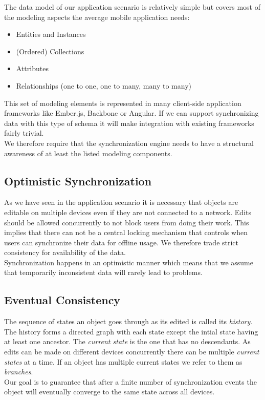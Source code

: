 The data model of our application scenario is relatively simple but covers most of the modeling aspects the average mobile application needs:

\begin{itemize}
\item Entities and Instances
\item (Ordered) Collections
\item Attributes
\item Relationships (one to one, one to many, many to many)
\end{itemize}

This set of modeling elements is represented in many client-side application frameworks like Ember.js, Backbone or Angular.
If we can support synchronizing data with this type of schema it will make integration with existing frameworks fairly trivial.\\
We therefore require that the synchronization engine needs to have a structural awareness of at least the listed modeling components.

\subsection{Optimistic Synchronization}
As we have seen in the application scenario it is necessary that objects are editable on multiple devices even if they are not connected to a network.
Edits should be allowed concurrently to not block users from doing their work.
This implies that there can not be a central locking mechanism that controls when users can synchronize their data for offline usage.
We therefore trade strict consistency for availability of the data.\\
Synchronization happens in an optimistic manner which means that we assume that temporarily inconsistent data will rarely lead to problems.

\subsection{Eventual Consistency}
The sequence of states an object goes through as its edited is called its \emph{history}.
The history forms a directed graph with each state except the intial state having at least one ancestor.
The \emph{current state} is the one that has no descendants.
As edits can be made on different devices concurrently there can be multiple \emph{current states} at a time.
If an object has multiple current states we refer to them as \emph{branches}.\\
Our goal is to guarantee that after a finite number of synchronization events the object will eventually converge to the same state across all devices.

